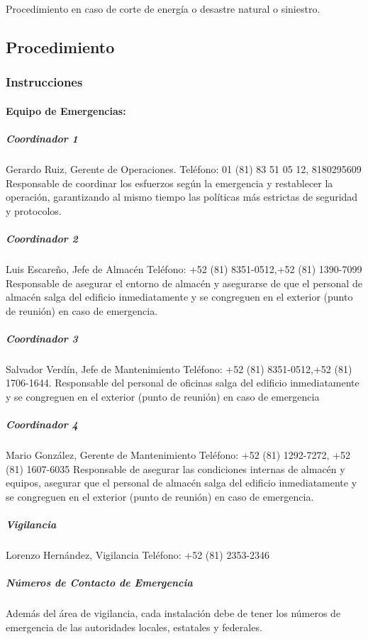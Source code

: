Procedimiento en caso de corte de energía o desastre natural o siniestro.

\subsection{Procedimiento}

\subsubsection{Instrucciones}

\paragraph{Equipo de Emergencias:}

\subparagraph{Coordinador 1}

Gerardo Ruiz, Gerente de Operaciones.
Teléfono: 01 (81) 83 51 05 12, 8180295609
Responsable de coordinar los esfuerzos según la emergencia y restablecer la operación, garantizando al mismo tiempo las políticas más estrictas de seguridad y protocolos.

\subparagraph{Coordinador 2}

Luis Escareño, Jefe de Almacén
Teléfono: +52 (81) 8351-0512,+52 (81) 1390-7099
Responsable de asegurar el entorno de almacén y asegurarse de que el personal de almacén salga del edificio inmediatamente y se congreguen en el exterior (punto de reunión) en caso de emergencia.

\subparagraph{Coordinador 3}

Salvador Verdín, Jefe de Mantenimiento
Teléfono: +52 (81) 8351-0512,+52 (81) 1706-1644.
Responsable del personal de oficinas salga del edificio inmediatamente y se congreguen en el exterior (punto de reunión) en caso de emergencia

\subparagraph{Coordinador 4}

Mario González, Gerente de Mantenimiento
Teléfono: +52 (81) 1292-7272, +52 (81) 1607-6035
Responsable de asegurar las condiciones internas de almacén y equipos, asegurar que el personal de almacén salga del edificio inmediatamente y se congreguen en el exterior (punto de reunión) en caso de emergencia.

\subparagraph{Vigilancia}

Lorenzo Hernández, Vigilancia
Teléfono: +52 (81) 2353-2346

\subparagraph{Números de Contacto de Emergencia}

Además del área de vigilancia, cada instalación debe de tener los números de emergencia de las autoridades locales, estatales y federales.



